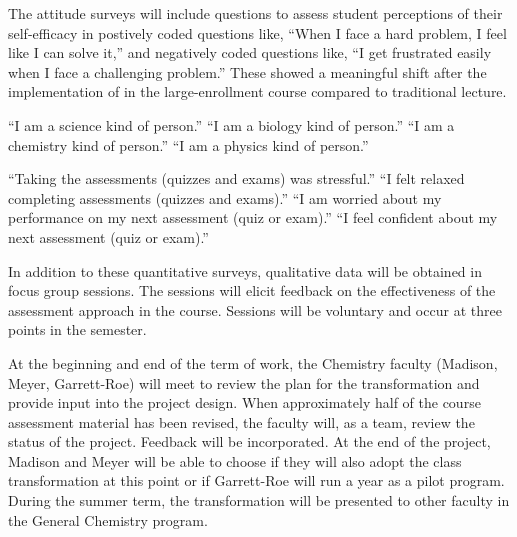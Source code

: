 \documentclass[10pt,letterpaper]{article}
\begin{document}
The attitude surveys will include questions to assess student perceptions of their self-efficacy in postively coded questions like, ``When I face a hard problem, I feel like I can solve it,'' and negatively coded questions like, ``I get frustrated easily when I face a challenging problem.'' These showed a meaningful shift after the implementation of \pogil  in the large-enrollment course compared to traditional lecture.

``I am a science kind of person.'' ``I am a biology kind of person.'' ``I am a chemistry kind of person.'' ``I am a physics kind of person.'' 

``Taking the assessments (quizzes and exams) was stressful.'' ``I felt relaxed completing assessments (quizzes and exams).'' ``I am worried about my performance on my next assessment (quiz or exam).'' ``I feel confident about my next assessment (quiz or exam).''

 In addition to these quantitative surveys, qualitative data will be obtained in focus group sessions. The sessions will elicit feedback on the effectiveness of the assessment approach in the course. Sessions will be voluntary and occur at three points in the semester.

At the beginning and end of the term of work, the \pogil Chemistry faculty (Madison, Meyer, Garrett-Roe) will meet to review the plan for the transformation and provide input into the project design. When approximately half of the course assessment material has been revised, the \pogil faculty will, as a team, review the status of the project. Feedback will be incorporated. At the end of the project, Madison and Meyer will be able to choose if they will also adopt the class transformation at this point or if Garrett-Roe will run a year as a pilot program. During the summer term, the transformation will be presented to other faculty in the General Chemistry program.
\end{document}
